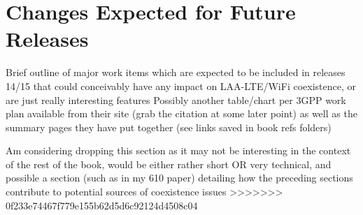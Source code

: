 \section {Changes Expected for Future Releases}
\label{fut-chnge}

Brief outline of major work items which are expected to be included in releases 14/15 that could conceivably have any impact on LAA-LTE/WiFi coexistence, or are just really interesting features 
Possibly another table/chart per 3GPP work plan available from their site (grab the citation at some later point) as well as the summary pages they have put together (see links saved in book refs folders)

Am considering dropping this section as it may not be interesting in the context of the rest of the book, would be either rather short OR very technical, and possible a section (such as in my 610 paper) detailing how the preceding sections contribute to potential sources of coexistence issues
>>>>>>> 0f233e74467f779e155b62d5d6c92124d4508c04


